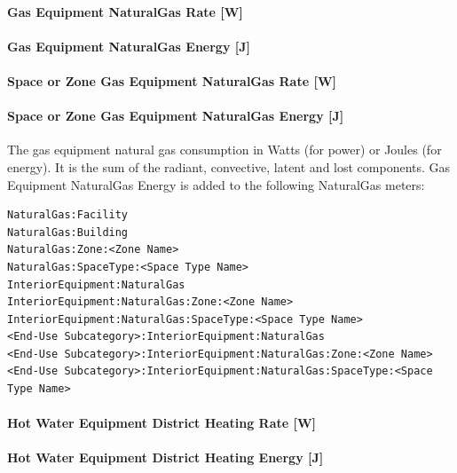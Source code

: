 \paragraph{Gas Equipment NaturalGas Rate {[}W{]}}\label{gas-equipment-gas-rate-w}

\paragraph{Gas Equipment NaturalGas Energy {[}J{]}}\label{gas-equipment-gas-energy-j}

\paragraph{Space or Zone Gas Equipment NaturalGas Rate {[}W{]}}\label{zone-gas-equipment-gas-rate-w}

\paragraph{Space or Zone Gas Equipment NaturalGas Energy {[}J{]}}\label{zone-gas-equipment-gas-energy-j}

The gas equipment natural gas consumption in Watts (for power) or Joules (for energy). It is the sum of the radiant, convective, latent and lost components. Gas Equipment NaturalGas Energy is added to the following NaturalGas meters:

\begin{lstlisting}
NaturalGas:Facility
NaturalGas:Building
NaturalGas:Zone:<Zone Name>
NaturalGas:SpaceType:<Space Type Name>
InteriorEquipment:NaturalGas
InteriorEquipment:NaturalGas:Zone:<Zone Name>
InteriorEquipment:NaturalGas:SpaceType:<Space Type Name>
<End-Use Subcategory>:InteriorEquipment:NaturalGas
<End-Use Subcategory>:InteriorEquipment:NaturalGas:Zone:<Zone Name>
<End-Use Subcategory>:InteriorEquipment:NaturalGas:SpaceType:<Space Type Name>
\end{lstlisting}

\paragraph{Hot Water Equipment District Heating Rate {[}W{]}}\label{hot-water-equipment-district-heating-rate-w}

\paragraph{Hot Water Equipment District Heating Energy {[}J{]}}\label{hot-water-equipment-district-heating-energy-j}

